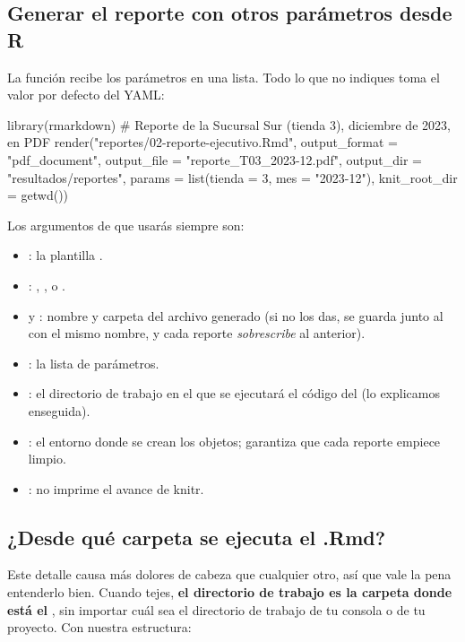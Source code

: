 \subsection{Generar el reporte con otros parámetros desde R}

La función  recibe los parámetros en una lista.
Todo lo que no indiques toma el valor por defecto del YAML:

\begin{rnoejecutar}
library(rmarkdown)
# Reporte de la Sucursal Sur (tienda 3), diciembre de 2023, en PDF
render("reportes/02-reporte-ejecutivo.Rmd",
       output_format = "pdf_document",
       output_file   = "reporte_T03_2023-12.pdf",
       output_dir    = "resultados/reportes",
       params        = list(tienda = 3, mes = "2023-12"),
       knit_root_dir = getwd())
\end{rnoejecutar}

Los argumentos de  que usarás siempre son:

\begin{itemize}
  \item {}: la plantilla .
  \item {}: ,
        ,  o .
  \item {} y : nombre y carpeta del
        archivo generado (si no los das, se guarda junto al 
        con el mismo nombre, y cada reporte \emph{sobrescribe} al anterior).
  \item {}: la lista de parámetros.
  \item {}: el directorio de trabajo en el que se
        ejecutará el código del  (lo explicamos enseguida).
  \item {}: el entorno donde se crean los objetos;
         garantiza que cada reporte empiece limpio.
  \item {}: no imprime el avance de knitr.
\end{itemize}

\subsection{¿Desde qué carpeta se ejecuta el .Rmd?}
\label{sec:m8-directorio}

Este detalle causa más dolores de cabeza que cualquier otro, así que vale la
pena entenderlo bien. Cuando tejes, \textbf{el directorio de trabajo es la
carpeta donde está el }, sin importar cuál sea el directorio
de trabajo de tu consola o de tu proyecto. Con nuestra estructura:

